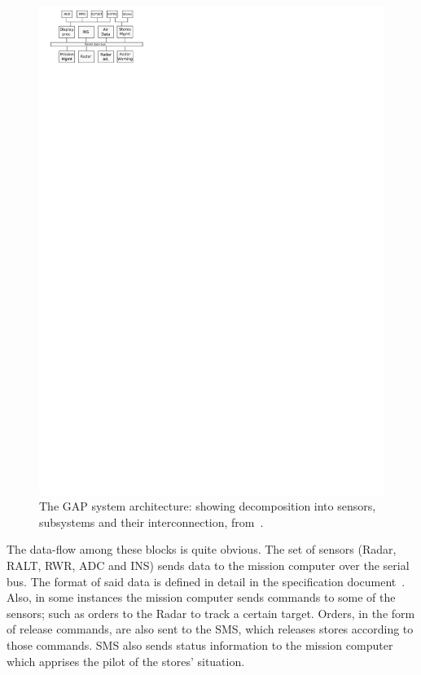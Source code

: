 \begin{figure}[htbp]
\centering
\includegraphics[scale=1.4]{figs/GAP_sys_arch}
\caption[Generic Avionics Platform architecture.]{The GAP system
  architecture: {\normalsize showing decomposition into sensors,
    subsystems and their interconnection, from~\cite{locke@rtss91}}.}
\label{fig:GAP}
\end{figure}

The data-flow among these blocks is quite obvious. The set of sensors
(Radar, RALT, RWR, ADC and INS) sends data to the mission computer
over the serial bus. The format of said data is defined in detail in
the specification document~\cite{locke@sei90}. Also, in some instances
the mission computer sends commands to some of the sensors; such as
orders to the Radar to track a certain target. Orders, in the form of
release commands, are also sent to the SMS, which releases stores
according to those commands. SMS also sends status information to the
mission computer which apprises the pilot of the stores' situation.

